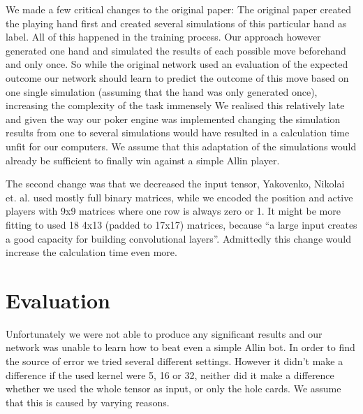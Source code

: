 \documentclass[]{report}
\begin{document}
We made a few critical changes to the original paper:
The original paper created the playing hand first and created several
simulations of this particular hand as label. All of this happened
in the training process. Our approach however generated one hand and
simulated the results of each possible move beforehand and only once.
So while the original network used an evaluation of the expected outcome
our network should learn to predict the outcome of this move based
on one single simulation (assuming that the hand was only generated
once), increasing the complexity of the task immensely We realised
this relatively late and given the way our poker engine was implemented
changing the simulation results from one to several simulations would
have resulted in a calculation time unfit for our computers. We assume
that this adaptation of the simulations would already be sufficient
to finally win against a simple Allin player.

The second change was that we decreased the input tensor, Yakovenko,
Nikolai et. al. used mostly full binary matrices, while we encoded
the position and active players with 9x9 matrices where one row is
always zero or 1. It might be more fitting to used 18 4x13 (padded
to 17x17) matrices, because ``a large input creates a good capacity
for building convolutional layers''\cite{1}. Admittedly this change
would increase the calculation time even more.

\section{Evaluation \label{see:evaluation} }

Unfortunately we were not able to produce any significant results and our network was unable to learn how to beat even a simple Allin bot. In order to find the source of error we tried several different settings. However it didn't make a difference if the used kernel were 5, 16 or 32, neither did it make a difference whether we used the whole tensor as input, or only the hole cards. We assume that this is caused by varying reasons. 
\end{document}
